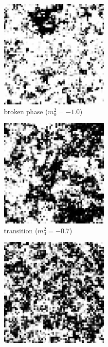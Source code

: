\begin{figure}[h]
    \begin{center}
      \begin{subfigure}[b]{0.3\textwidth}\centering
        \includegraphics[width=0.6\textwidth]{imgs/broken.png}
        \caption{broken phase ($m_0^2=-1.0$)}
      \end{subfigure}%
      \hfill
      \begin{subfigure}[b]{0.3\textwidth}\centering
        \includegraphics[width=0.6\textwidth]{imgs/transition.png}
        \caption{transition ($m_0^2=-0.7$)}
      \end{subfigure}%
      \hfill
      \begin{subfigure}[b]{0.3\textwidth}\centering
        \includegraphics[width=0.6\textwidth]{imgs/symmetric.png}

\end{subfigure}
\end{center}
\end{figure}
